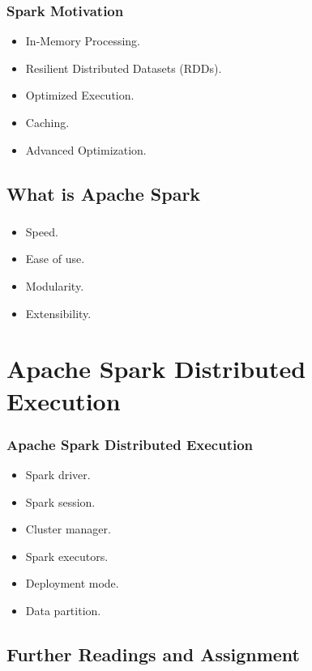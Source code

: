 \begin{frame}
	\frametitle{Spark Motivation}
	\begin{itemize}

\item In-Memory Processing.

\item Resilient Distributed Datasets (RDDs).%

\item Optimized Execution.%

\item Caching.%

\item Advanced Optimization.%

	\end{itemize}
\end{frame}
\subsection{What is Apache Spark}
\begin{frame}
\frametitle{\subsecname}
\begin{itemize}
	\item Speed. \pause
	\item Ease of use. \pause
	\item Modularity. \pause
	\item Extensibility. \pause
\end{itemize}
\end{frame}
\section{Apache Spark Distributed Execution}
\begin{frame}
\frametitle{Apache Spark Distributed Execution}
\begin{itemize}
	\item Spark driver. \pause
	\item Spark session. \pause
	\item Cluster manager. \pause
	\item Spark executors. \pause
	\item Deployment mode. \pause
	\item Data partition. \pause
\end{itemize}
\end{frame}
\subsection{Further Readings and Assignment}

